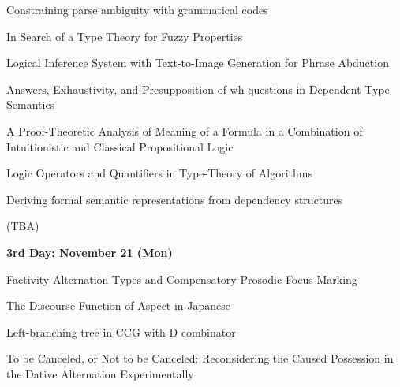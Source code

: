 \documentclass[12pt]{jarticle}
\begin{document}
      {Constraining parse ambiguity with grammatical codes}
      {}




  
      {In Search of a Type Theory for Fuzzy Properties}
      {}
  
      {Logical Inference System with Text-to-Image Generation for Phrase Abduction}
      {}
  
      {Answers, Exhaustivity, and Presupposition of wh-questions in Dependent Type Semantics}
      {}




  
      {A Proof-Theoretic Analysis of Meaning of a Formula in a Combination of Intuitionistic and Classical Propositional Logic}
      {}
  
      {Logic Operators and Quantifiers in Type-Theory of Algorithms}
      {}
  
      {Deriving formal semantic representations from dependency structures}
      {}




  
      {(TBA)}
      {}




\noindent\textbf{\large 
3rd Day: November 21 (Mon)
}\\




  
      {Factivity Alternation Types and Compensatory Prosodic Focus Marking}
      {}
  
      {The Discourse Function of Aspect in Japanese}
      {}
  
      {Left-branching tree in CCG with D combinator}
      {}




  
      {To be Canceled, or Not to be Canceled: Reconsidering the Caused Possession in the Dative Alternation Experimentally}
      {}
  
\end{document}
